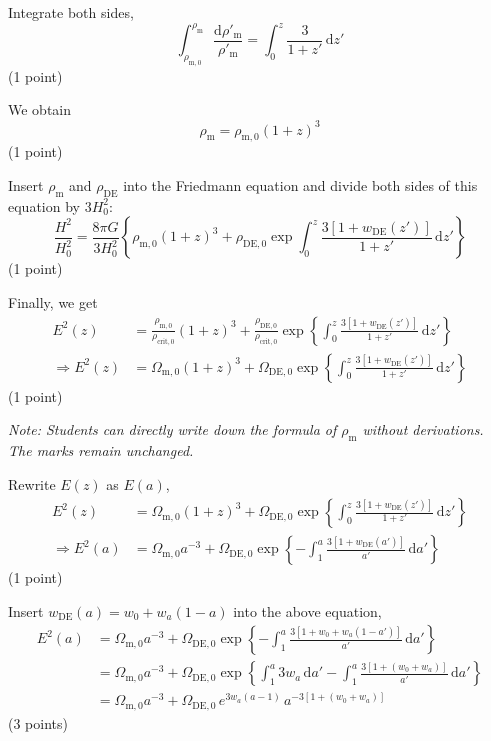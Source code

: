\begin{description}
  Integrate both sides,
  \[ \int_{\rho_{\mathrm{m},0}}^{\rho_{\mathrm{m}}}
     \frac{\mathrm{d}\rho'_{\mathrm{m}}}{\rho'_{\mathrm{m}}}
     = \int_0^z \frac{3}{1+z'}\,\mathrm{d}z' \]
  \hfill(1 point)

  We obtain
  \[ \rho_{\mathrm{m}} = \rho_{\mathrm{m},0}(1+z)^3 \]
  \hfill(1 point)

  Insert $\rho_{\mathrm{m}}$ and $\rho_{\mathrm{DE}}$ into the Friedmann
  equation and divide both sides of this equation by $3H_0^2$:
  \[ \frac{H^2}{H_0^2} = \frac{8\pi G}{3H_0^2}\left\{
     \rho_{\mathrm{m},0}(1+z)^3 + \rho_{\mathrm{DE},0}
     \exp\int_0^z \frac{3\left[1 + w_{\mathrm{DE}}(z')\right]}{1+z'}
     \,\mathrm{d}z'\right\} \]
  \hfill(1 point)

  Finally, we get
  \begin{align*}
    E^2(z) &= \frac{\rho_{\mathrm{m},0}}{\rho_{\mathrm{crit},0}}(1+z)^3
      + \frac{\rho_{\mathrm{DE},0}}{\rho_{\mathrm{crit},0}}
        \exp\left\{\int_0^z \frac{3\left[1 + w_{\mathrm{DE}}(z')\right]}{1+z'}
        \,\mathrm{d}z'\right\} \\
    \Rightarrow E^2(z) &= \Omega_{\mathrm{m},0}(1+z)^3 + \Omega_{\mathrm{DE},0}
        \exp\left\{\int_0^z \frac{3\left[1 + w_{\mathrm{DE}}(z')\right]}{1+z'}
        \,\mathrm{d}z'\right\}
  \end{align*}
  \hfill(1 point)

  \textit{Note: Students can directly write down the formula of
  $\rho_{\mathrm{m}}$ without derivations. The marks remain unchanged.}

\item[(c)] Rewrite $E(z)$ as $E(a)$,
  \begin{align*}
    E^2(z) &= \Omega_{\mathrm{m},0}(1+z)^3 + \Omega_{\mathrm{DE},0}
      \exp\left\{\int_0^z \frac{3\left[1 + w_{\mathrm{DE}}(z')\right]}{1+z'}
      \,\mathrm{d}z'\right\} \\
    \Rightarrow E^2(a) &= \Omega_{\mathrm{m},0}a^{-3} + \Omega_{\mathrm{DE},0}
      \exp\left\{-\int_1^a \frac{3\left[1 + w_{\mathrm{DE}}(a')\right]}{a'}
      \,\mathrm{d}a'\right\}
  \end{align*}
  \hfill(1 point)

  Insert $w_{\mathrm{DE}}(a) = w_0 + w_a(1-a)$ into the above equation,
  \begin{align*}
    E^2(a) &= \Omega_{\mathrm{m},0}a^{-3} + \Omega_{\mathrm{DE},0}
      \exp\left\{-\int_1^a \frac{3\left[1 + w_0 + w_a(1-a')\right]}{a'}
      \,\mathrm{d}a'\right\} \\
    &= \Omega_{\mathrm{m},0}a^{-3} + \Omega_{\mathrm{DE},0}
      \exp\left\{\int_1^a 3w_a\,\mathrm{d}a'
      - \int_1^a \frac{3\left[1 + (w_0 + w_a)\right]}{a'}\,\mathrm{d}a'\right\} \\
    &= \Omega_{\mathrm{m},0}a^{-3} + \Omega_{\mathrm{DE},0}\,
      e^{3w_a(a-1)}\,a^{-3[1+(w_0+w_a)]}
  \end{align*}
  \hfill(3 points)


\end{description}
